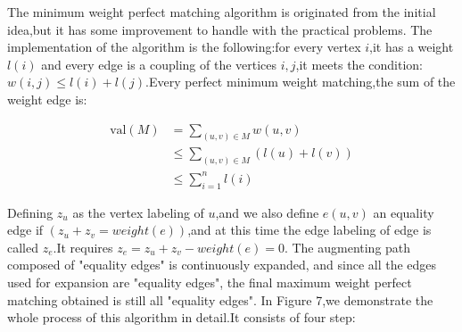 \documentclass[
	a4paper, %
	10pt, %
	unnumberedsections, %
	twoside, %
]{LTJournalArticle}
\begin{document}
	The minimum weight perfect matching algorithm is originated from the initial idea,but it has some improvement to handle with the practical problems.
	The implementation of the algorithm is the following:for every vertex $i$,it has a weight $l(i)$ and every edge is a coupling of the vertices $i,j$,it meets the condition:$w(i,j) \leq l(i)+l(j)$.Every perfect minimum weight matching,the sum of the weight edge is:
\begin{center}
\begin{align*}
    \text{val}(M) &= \sum_{(u,v)\in M}w(u,v) \\
    &\leq \sum_{(u,v)\in M}(l(u)+l(v)) \\
    &\leq \sum_{i=1}^{n}l(i)
\end{align*}
\end{center}
Defining $z_u$ as the vertex labeling of $u$,and we also define $e(u,v)$ an equality edge if $(z_u+z_v=weight(e))$,and at this time the edge labeling of edge is called $z_e$.It requires $z_e=z_u+z_v-weight(e)=0$.
The augmenting path composed of "equality edges" is continuously expanded, and since all the edges used for expansion are "equality edges", the final maximum weight perfect matching obtained is still all "equality edges".
In Figure 7,we demonstrate the whole process of this algorithm in detail.It consists of four step:
\end{document}
